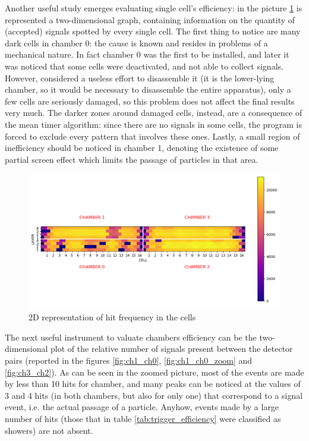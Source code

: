 \documentclass[a4paper,11pt]{book}
\begin{document}
Another useful study emerges evaluating single cell's efficiency: in the picture \ref{fig:hit_freq} is represented a two-dimensional graph, containing information on the quantity of (accepted) signals spotted by every single cell. The first thing to notice are many dark cells in chamber 0: the cause is known and resides in problems of a mechanical nature. In fact chamber 0 was the first to be installed, 
and later it was noticed that some cells were deactivated, and not able to collect signals. However, considered a useless effort to disassemble it (it is the lower-lying chamber, so it would be necessary to disassemble the entire apparatus), only a few cells are seriously damaged, so this problem does not affect the final results very much. The darker zones around damaged cells, instead, are a consequence of the mean timer algorithm: since there are no signals in some cells, the program is forced to exclude every pattern that involves these ones. Lastly, a small region of inefficiency should be noticed in chamber 1, denoting the existence of  some partial screen effect which limits the passage of particles in that area.\\

\begin{figure}[!hbtp]
\centering
\includegraphics[scale=0.7]{pictures/Hit_matrix.pdf}
\caption{2D representation of hit frequency in the cells}
\label{fig:hit_freq}
\end{figure}

The next useful instrument to valuate chambers efficiency can be the two-dimensional plot of the relative number of signals present between the detector pairs (reported in the figures \ref{fig:ch1_ch0}, \ref{fig:ch1_ch0_zoom} and \ref{fig:ch3_ch2}). As can be seen in the zoomed picture, most of the events are made by less than 10 hits for chamber, and many peaks can be noticed at the values of 3 and 4 hits (in both chambers, but also for only one) that correspond to a signal event, i.e. the actual passage of a particle. Anyhow, events made by a large number of hits (those that in table \ref{tab:trigger_efficiency} were classified as showers) are not absent.\\
\end{document}
